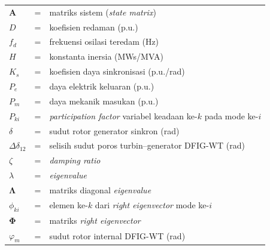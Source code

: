 \begin{tabular}{llp{3in}}

	$\mathbf{A}$           & \hspace{1.5cm} = & matriks sistem (\textit{state matrix}) \\
	$D$                    & \hspace{1.5cm} = & koefisien redaman (p.u.) \\
	$f_d$                  & \hspace{1.5cm} = & frekuensi osilasi teredam (Hz) \\
	$H$                    & \hspace{1.5cm} = & konstanta inersia (MWs/MVA) \\
	$K_s$                  & \hspace{1.5cm} = & koefisien daya sinkronisasi (p.u./rad) \\
	$P_e$                  & \hspace{1.5cm} = & daya elektrik keluaran (p.u.) \\
	$P_m$                  & \hspace{1.5cm} = & daya mekanik masukan (p.u.) \\
	$P_{ki}$               & \hspace{1.5cm} = & \textit{participation factor} variabel keadaan ke-$k$ pada mode ke-$i$ \\
	$\delta$               & \hspace{1.5cm} = & sudut rotor generator sinkron (rad) \\
	$\Delta\delta_{12}$    & \hspace{1.5cm} = & selisih sudut poros turbin--generator DFIG-WT (rad) \\
	$\zeta$                & \hspace{1.5cm} = & \textit{damping ratio} \\
	$\lambda$              & \hspace{1.5cm} = & \textit{eigenvalue} \\
	$\boldsymbol{\Lambda}$ & \hspace{1.5cm} = & matriks diagonal \textit{eigenvalue} \\
	$\phi_{ki}$            & \hspace{1.5cm} = & elemen ke-$k$ dari \textit{right eigenvector} mode ke-$i$ \\
	$\boldsymbol{\Phi}$    & \hspace{1.5cm} = & matriks \textit{right eigenvector} \\
	$\varphi_m$            & \hspace{1.5cm} = & sudut rotor internal DFIG-WT (rad) \\

\end{tabular}
